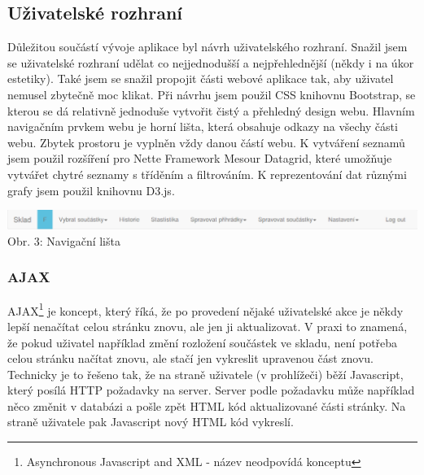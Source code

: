 \documentclass[12pt, a4paper, oneside]{article}
\begin{document}
\subsection{Uživatelské rozhraní}

Důležitou součástí vývoje aplikace byl návrh uživatelského rozhraní. Snažil jsem se uživatelské rozhraní udělat co nejjednodušší a nejpřehlednější (někdy i na úkor estetiky). Také jsem se snažil propojit části webové aplikace tak, aby uživatel nemusel zbytečně moc klikat. Při návrhu jsem použil CSS knihovnu Bootstrap, se kterou se dá relativně jednoduše vytvořit čistý a přehledný design webu. Hlavním navigačním prvkem webu je horní lišta, která obsahuje odkazy na všechy části webu. Zbytek prostoru je vyplněn vždy danou částí webu. K vytváření seznamů jsem použil rozšíření pro Nette Framework Mesour Datagrid\cite{mesour}, které umožňuje vytvářet chytré seznamy s tříděním a filtrováním. K reprezentování dat různými grafy jsem použil knihovnu D3.js\cite{d3}.

\vspace{6mm}
\begin{minipage}{\textwidth}
\begin{center}
\hspace*{-2cm}
\includegraphics[scale=0.55]{img/web_navbar.png}
\\
\caption{Obr. 3: Navigační lišta}
\end{center}
\end{minipage}
\vspace{4mm}

\subsubsection{AJAX}

AJAX\footnote{Asynchronous Javascript and XML - název neodpovídá konceptu} je koncept, který říká, že po provedení nějaké uživatelské akce je někdy lepší nenačítat celou stránku znovu, ale jen ji aktualizovat. V praxi to znamená, že pokud uživatel například změní rozložení součástek ve skladu, není potřeba celou stránku načítat znovu, ale stačí jen vykreslit upravenou část znovu. Technicky je to řešeno tak, že na straně uživatele (v prohlížeči) běží Javascript, který posílá HTTP požadavky na server. Server podle požadavku může například něco změnit v databázi a pošle zpět HTML kód aktualizované části stránky. Na straně uživatele pak Javascript nový HTML kód vykreslí.
\end{document}
